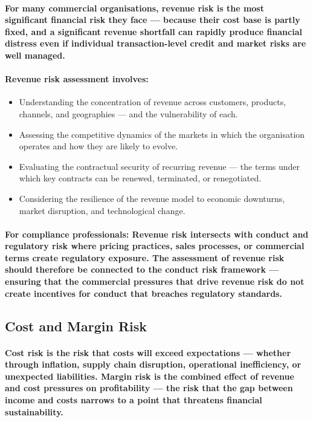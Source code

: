 \paragraph{For many commercial organisations, revenue risk is the most significant financial risk they face — because their cost base is partly fixed, and a significant revenue shortfall can rapidly produce financial distress even if individual transaction-level credit and market risks are well managed.}
\paragraph{Revenue risk assessment involves:}
\begin{itemize}
    \item{Understanding the concentration of revenue across customers, products, channels, and geographies — and the vulnerability of each.}
    \item{Assessing the competitive dynamics of the markets in which the organisation operates and how they are likely to evolve.}
    \item{Evaluating the contractual security of recurring revenue — the terms under which key contracts can be renewed, terminated, or renegotiated.}
    \item{Considering the resilience of the revenue model to economic downturns, market disruption, and technological change.}
\end{itemize}
\paragraph{\textbf{For compliance professionals}: Revenue risk intersects with conduct and regulatory risk where pricing practices, sales processes, or commercial terms create regulatory exposure. The assessment of revenue risk should therefore be connected to the conduct risk framework — ensuring that the commercial pressures that drive revenue risk do not create incentives for conduct that breaches regulatory standards.}

\subsection{Cost and Margin Risk}
\paragraph{\textbf{Cost risk} is the risk that costs will exceed expectations — whether through inflation, supply chain disruption, operational inefficiency, or unexpected liabilities. \textbf{Margin risk} is the combined effect of revenue and cost pressures on profitability — the risk that the gap between income and costs narrows to a point that threatens financial sustainability.}
